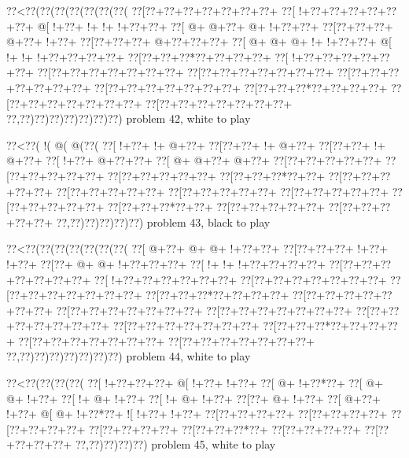 \vbox{\vbox{\goo
\0??<\0??(\0??(\0??(\0??(\0??(\0??(\0??(
\0??[\0??+\0??+\0??+\0??+\0??+\0??+\0??+
\0??[\- !+\0??+\0??+\0??+\0??+\0??+\0??+
\- @[\- !+\0??+\- !+\- !+\- !+\0??+\0??+
\0??[\- @+\- @+\0??+\- @+\- !+\0??+\0??+
\0??[\0??+\0??+\0??+\- @+\0??+\- !+\0??+
\0??[\0??+\0??+\0??+\- @+\0??+\0??+\0??+
\0??[\- @+\- @+\- @+\- !+\- !+\0??+\0??+
\- @[\- !+\- !+\- !+\0??+\0??+\0??+\0??+
\0??[\0??+\0??+\0??*\0??+\0??+\0??+\0??+
\0??[\- !+\0??+\0??+\0??+\0??+\0??+\0??+
\0??[\0??+\0??+\0??+\0??+\0??+\0??+\0??+
\0??[\0??+\0??+\0??+\0??+\0??+\0??+\0??+
\0??[\0??+\0??+\0??+\0??+\0??+\0??+\0??+
\0??[\0??+\0??+\0??+\0??+\0??+\0??+\0??+
\0??[\0??+\0??+\0??*\0??+\0??+\0??+\0??+
\0??[\0??+\0??+\0??+\0??+\0??+\0??+\0??+
\0??[\0??+\0??+\0??+\0??+\0??+\0??+\0??+
\0??,\0??)\0??)\0??)\0??)\0??)\0??)\0??)
}
\hfil problem 42, white to play\hfil\break
}

\vbox{\vbox{\goo
\0??<\0??(\- !(\- @(\- @(\0??(
\0??[\- !+\0??+\- !+\- @+\0??+
\0??[\0??+\0??+\- !+\- @+\0??+
\0??[\0??+\0??+\- !+\- @+\0??+
\0??[\- !+\0??+\- @+\0??+\0??+
\0??[\- @+\- @+\0??+\- @+\0??+
\0??[\0??+\0??+\0??+\0??+\0??+
\0??[\0??+\0??+\0??+\0??+\0??+
\0??[\0??+\0??+\0??+\0??+\0??+
\0??[\0??+\0??+\0??*\0??+\0??+
\0??[\0??+\0??+\0??+\0??+\0??+
\0??[\0??+\0??+\0??+\0??+\0??+
\0??[\0??+\0??+\0??+\0??+\0??+
\0??[\0??+\0??+\0??+\0??+\0??+
\0??[\0??+\0??+\0??+\0??+\0??+
\0??[\0??+\0??+\0??*\0??+\0??+
\0??[\0??+\0??+\0??+\0??+\0??+
\0??[\0??+\0??+\0??+\0??+\0??+
\0??,\0??)\0??)\0??)\0??)\0??)
}
\hfil problem 43, black to play\hfil\break
}

\vbox{\vbox{\goo
\0??<\0??(\0??(\0??(\0??(\0??(\0??(\0??(
\0??[\- @+\0??+\- @+\- @+\- !+\0??+\0??+
\0??[\0??+\0??+\0??+\- !+\0??+\- !+\0??+
\0??[\0??+\- @+\- @+\- !+\0??+\0??+\0??+
\0??[\- !+\- !+\- !+\0??+\0??+\0??+\0??+
\0??[\0??+\0??+\0??+\0??+\0??+\0??+\0??+
\0??[\- !+\0??+\0??+\0??+\0??+\0??+\0??+
\0??[\0??+\0??+\0??+\0??+\0??+\0??+\0??+
\0??[\0??+\0??+\0??+\0??+\0??+\0??+\0??+
\0??[\0??+\0??+\0??*\0??+\0??+\0??+\0??+
\0??[\0??+\0??+\0??+\0??+\0??+\0??+\0??+
\0??[\0??+\0??+\0??+\0??+\0??+\0??+\0??+
\0??[\0??+\0??+\0??+\0??+\0??+\0??+\0??+
\0??[\0??+\0??+\0??+\0??+\0??+\0??+\0??+
\0??[\0??+\0??+\0??+\0??+\0??+\0??+\0??+
\0??[\0??+\0??+\0??*\0??+\0??+\0??+\0??+
\0??[\0??+\0??+\0??+\0??+\0??+\0??+\0??+
\0??[\0??+\0??+\0??+\0??+\0??+\0??+\0??+
\0??,\0??)\0??)\0??)\0??)\0??)\0??)\0??)
}
\hfil problem 44, white to play\hfil\break
}

\vbox{\vbox{\goo
\0??<\0??(\0??(\0??(\0??(
\0??[\- !+\0??+\0??+\0??+
\- @[\- !+\0??+\- !+\0??+
\0??[\- @+\- !+\0??*\0??+
\0??[\- @+\- @+\- !+\0??+
\0??[\- !+\- @+\- !+\0??+
\0??[\- !+\- @+\- !+\0??+
\0??[\0??+\- @+\- !+\0??+
\0??[\- @+\0??+\- !+\0??+
\- @[\- @+\- !+\0??*\0??+
\- ![\- !+\0??+\- !+\0??+
\0??[\0??+\0??+\0??+\0??+
\0??[\0??+\0??+\0??+\0??+
\0??[\0??+\0??+\0??+\0??+
\0??[\0??+\0??+\0??+\0??+
\0??[\0??+\0??+\0??*\0??+
\0??[\0??+\0??+\0??+\0??+
\0??[\0??+\0??+\0??+\0??+
\0??,\0??)\0??)\0??)\0??)
}
\hfil problem 45, white to play\hfil\break
}

